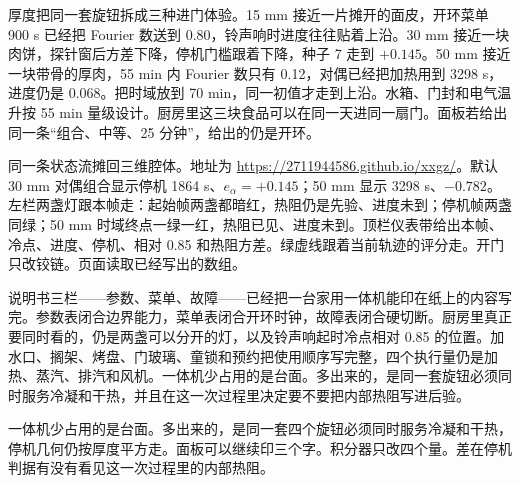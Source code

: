 厚度把同一套旋钮拆成三种进门体验。15 mm 接近一片摊开的面皮，开环菜单 900 s 已经把 Fourier 数送到 0.80，铃声响时进度往往贴着上沿。30 mm 接近一块肉饼，探针窗后方差下降，停机门槛跟着下降，种子 7 走到 \(+0.145\)。50 mm 接近一块带骨的厚肉，55 min 内 Fourier 数只有 0.12，对偶已经把加热用到 3298 s，进度仍是 0.068。把时域放到 70 min，同一初值才走到上沿。水箱、门封和电气温升按 55 min 量级设计。厨房里这三块食品可以在同一天进同一扇门。面板若给出同一条“组合、中等、25 分钟”，给出的仍是开环。

同一条状态流摊回三维腔体。地址为 \url{https://2711944586.github.io/xxgz/}。默认 30 mm 对偶组合显示停机 1864 s、\(e_{\alpha}=+0.145\)；50 mm 显示 3298 s、\(-0.782\)。左栏两盏灯跟本帧走：起始帧两盏都暗红，热阻仍是先验、进度未到；停机帧两盏同绿；50 mm 时域终点一绿一红，热阻已见、进度未到。顶栏仪表带给出本帧、冷点、进度、停机、相对 0.85 和热阻方差。绿虚线跟着当前轨迹的评分走。开门只改铰链。页面读取已经写出的数组。

说明书三栏——参数、菜单、故障——已经把一台家用一体机能印在纸上的内容写完。参数表闭合边界能力，菜单表闭合开环时钟，故障表闭合硬切断。厨房里真正要同时看的，仍是两盏可以分开的灯，以及铃声响起时冷点相对 0.85 的位置。加水口、搁架、烤盘、门玻璃、童锁和预约把使用顺序写完整，四个执行量仍是加热、蒸汽、排汽和风机。一体机少占用的是台面。多出来的，是同一套旋钮必须同时服务冷凝和干热，并且在这一次过程里决定要不要把内部热阻写进后验。

一体机少占用的是台面。多出来的，是同一套四个旋钮必须同时服务冷凝和干热，停机几何仍按厚度平方走。面板可以继续印三个字。积分器只改四个量。差在停机判据有没有看见这一次过程里的内部热阻。
